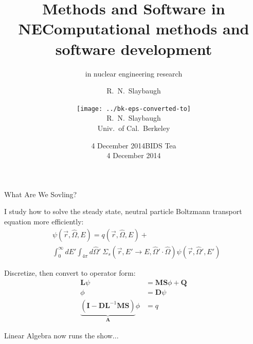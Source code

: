 \documentclass[xcolor=x11names,compress]{beamer}
\title{Methods and Software in NE}
\author{R.\ N.\ Slaybaugh}
\date{4 December 2014}
\renewcommand{\(}{\begin{columns}}
\renewcommand{\)}{\end{columns}}
\newcommand{\<}[1]{\begin{column}{#1}}
\renewcommand{\>}{\end{column}}
\newcommand{\Macro}{\ensuremath{\Sigma}}
\newcommand{\vOmega}{\ensuremath{\hat{\Omega}}}
\newcommand{\ve}[1]{\ensuremath{\mathbf{#1}}}
\begin{document}
\begin{frame}
\title{Computational methods and software development }
\subtitle{in nuclear engineering research}
\author{
        \texttt{[image: ../bk-eps-converted-to]}\\R.\ N.\ Slaybaugh \\ Univ.\ of Cal.\ Berkeley}

\date{BIDS Tea \\ 4 December 2014}
\titlepage
\end{frame}

\begin{frame}{What Are We Sovling?}

    I study how to solve the steady state, neutral particle Boltzmann transport equation
    more efficiently:
    \begin{align}
    [\vOmega \cdot \nabla + \Macro(\vec{r}, E)] &\psi(\vec{r}, \vOmega, E)  =  q(\vec{r}, \vOmega, E) + \nonumber\\
     &\int_0^{\infty} dE' \int_{4\pi} d\vOmega' \:\Macro_{s}(\vec{r}, E' \to E,
     \vOmega' \cdot \vOmega) \psi(\vec{r}, \vOmega', E') \nonumber
    \end{align}

    Discretize, then convert to operator form:
    \begin{align}
    \mathbf{L} \psi &= \mathbf{MS}\phi + \mathbf{Q} \nonumber\\
    \phi &= \mathbf{D}\psi \nonumber \\
    \underbrace{(\ve{I} - \ve{DL}^{-1}\ve{MS})}_{\mathbf{A}}\phi &= q\nonumber
    \end{align}
    
    \textcolor{dgreen}{Linear Algebra} now runs the show...
    
\end{frame}
\end{document}
